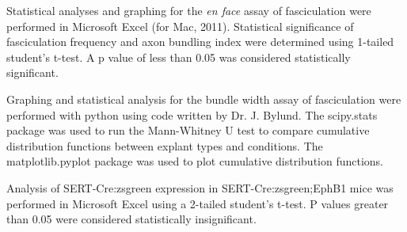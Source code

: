 Statistical analyses and graphing for the \emph{en face} assay of fasciculation were performed in Microsoft Excel (for Mac, 2011).
Statistical significance of fasciculation frequency and axon bundling index were determined using 1-tailed student's t-test.
A p value of less than 0.05 was considered statistically significant.

Graphing and statistical analysis for the bundle width assay of fasciculation were performed with python using code written by Dr. J. Bylund.
The scipy.stats package was used to run the Mann-Whitney U test to compare cumulative distribution functions between explant types and conditions.
The matplotlib.pyplot package was used to plot cumulative distribution functions.

Analysis of SERT-Cre:zsgreen expression in SERT-Cre:zsgreen;EphB1 mice was performed in Microsoft Excel using a 2-tailed student's t-test.
P values greater than 0.05 were considered statistically insignificant.